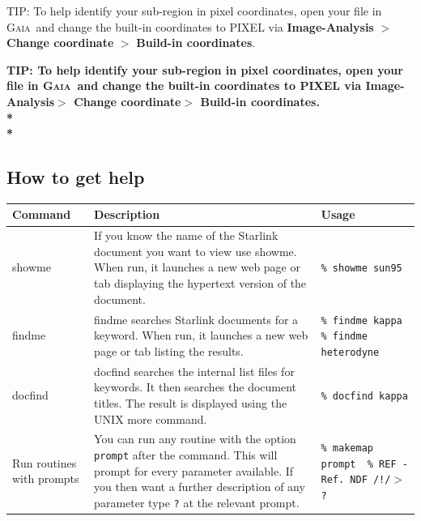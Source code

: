 \documentclass[twoside,11pt]{article}
\newenvironment{latexonly}{}{}
\newcommand{\xref}[3]{#1}
\newcommand{\xlabel}[1]{}
\renewcommand{\_}{\texttt{\symbol{95}}}
\newenvironment{fmpage}[1]{\begin{lrbox}{\fmbox}\begin{minipage}{#1}}{\end{minipage}\end{lrbox}\fbox{\usebox{\fmbox}}}
\newcommand{\gaia}{\xref{\textsc{Gaia}}{sun214}{}}
\newcommand{\task}[1]{\textsf{#1}}
\newcommand{\gaiathing}[1]{\textbf{\textsf{#1}}}
\begin{document}
\begin{latexonly}
\begin{center}
\begin{fmpage}{0.95\linewidth}
\vspace{0.1cm}
TIP: To help identify your sub-region in pixel coordinates, open your file in \gaia\ and change the built-in coordinates to PIXEL via \gaiathing{Image-Analysis} $>$ \gaiathing{Change coordinate} $>$ \gaiathing{Build-in coordinates}.
\end{fmpage}
\end{center}
\end{latexonly}

\begin{htmlonly}
\textbf{TIP: To help identify your sub-region in pixel coordinates, open your file in \gaia\ and change the built-in coordinates to PIXEL via \gaiathing{Image-Analysis}$>$ \gaiathing{Change coordinate}$>$ \gaiathing{Build-in coordinates}. \\*\\*}
\end{htmlonly}

\newpage
\subsection{\xlabel{help}How to get help}
\label{sec:help}
\begin{table}[h!]
\begin{tabular}{p{2.3cm}|p{7.3cm}|p{5cm}}
\textbf{Command} & \textbf{Description} & \textbf{Usage}\\
\hline
\task{showme} & If you know the name of the Starlink document you want to view
                use \task{showme}. When run, it launches a new web page or tab
                displaying the hypertext version of the document. &
                \texttt{\% showme sun95}\\
\hline
\task{findme} & \task{findme} searches Starlink documents for a keyword. When
                run, it launches a new web page or tab listing the results. &
                \texttt{\% findme kappa} \newline  \texttt{\% findme heterodyne}\\
\hline
\task{docfind} & \task{docfind} searches the internal list files for keywords. It then
                 searches the document titles. The result is displayed using the
                 UNIX \task{more} command. & \texttt{\% docfind kappa}\\
\hline
Run routines with prompts & You can run any routine with the option
                            \texttt{prompt} after the command. This will
                            prompt for every parameter available. If you
                            then want a further description of any parameter
                            type  \texttt{?} at the relevant prompt. &
                            \texttt{\% makemap prompt \newline\ \% REF - Ref. NDF /!/$>$ ?}\\
\hline
\end{tabular}
\end{table}
\end{document}
